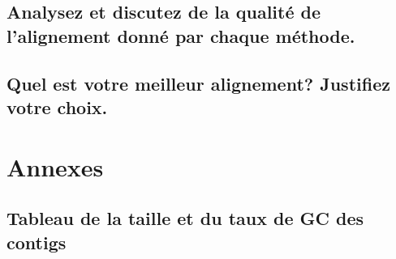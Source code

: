 \documentclass[10.9pt]{article} %
\renewcommand{\thesubsection}{\alph{subsection}}
\begin{document}
\subsection[Qualité des alignements]{Analysez et discutez de la qualité de l'alignement donné par chaque méthode.}

\subsection[Meilleur alignement]{Quel est votre meilleur alignement? Justifiez votre choix.}

\begingroup
\renewcommand{\appendix}{%
    \renewcommand{\thesubsection}{\arabic{subsection}}
}

\newpage
\appendix
\section{Annexes}

\subsection{Tableau de la taille et du taux de GC des contigs}\label{1}
\end{document}
